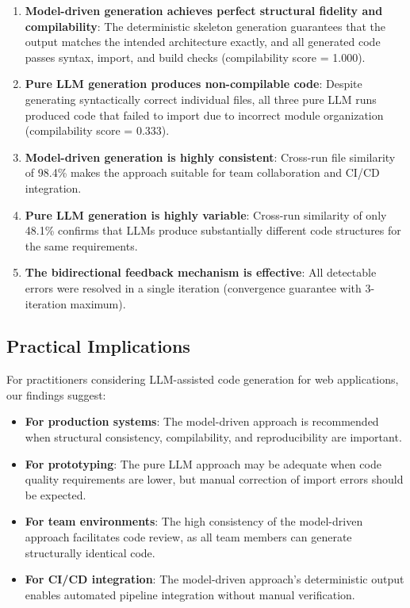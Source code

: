 \documentclass[11pt,a4paper]{article}
\begin{document}
{{\begin{enumerate}[leftmargin=*]
    \item \textbf{Model-driven generation achieves perfect structural fidelity and compilability}: The deterministic skeleton generation guarantees that the output matches the intended architecture exactly, and all generated code passes syntax, import, and build checks (compilability score = 1.000).
    \item \textbf{Pure LLM generation produces non-compilable code}: Despite generating syntactically correct individual files, all three pure LLM runs produced code that failed to import due to incorrect module organization (compilability score = 0.333).
    \item \textbf{Model-driven generation is highly consistent}: Cross-run file similarity of 98.4\% makes the approach suitable for team collaboration and CI/CD integration.
    \item \textbf{Pure LLM generation is highly variable}: Cross-run similarity of only 48.1\% confirms that LLMs produce substantially different code structures for the same requirements.
    \item \textbf{The bidirectional feedback mechanism is effective}: All detectable errors were resolved in a single iteration (convergence guarantee with 3-iteration maximum).
\end{enumerate}

\subsection{Practical Implications}

For practitioners considering LLM-assisted code generation for web applications, our findings suggest:

\begin{itemize}
    \item \textbf{For production systems}: The model-driven approach is recommended when structural consistency, compilability, and reproducibility are important.
    \item \textbf{For prototyping}: The pure LLM approach may be adequate when code quality requirements are lower, but manual correction of import errors should be expected.
    \item \textbf{For team environments}: The high consistency of the model-driven approach facilitates code review, as all team members can generate structurally identical code.
    \item \textbf{For CI/CD integration}: The model-driven approach's deterministic output enables automated pipeline integration without manual verification.
\end{itemize}

}}
\end{document}

